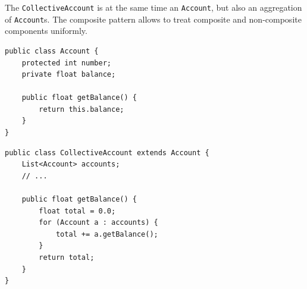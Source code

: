 \documentclass[11pt, a4paper]{article}
\newcommand{\settextlisting}{\lstset{ basicstyle=\small\ttfamily }}
\newcommand{\setcodelisting}{\lstset{ basicstyle=\footnotesize\ttfamily }}
\begin{document}
\settextlisting
The \lstinline|CollectiveAccount| is at the same time an \lstinline|Account|, but also an aggregation of \lstinline|Account|s.
The composite pattern allows to treat composite and non-composite components uniformly.

\bigskip
\setcodelisting
\begin{lstlisting}
public class Account {
	protected int number;
	private float balance;
	
	public float getBalance() {
		return this.balance;
	}
}
\end{lstlisting}


\begin{lstlisting}
public class CollectiveAccount extends Account {
	List<Account> accounts;
	// ...
	
	public float getBalance() {
		float total = 0.0;
		for (Account a : accounts) {
			total += a.getBalance();
		}
		return total;
	}
}
\end{lstlisting}
\end{document}
